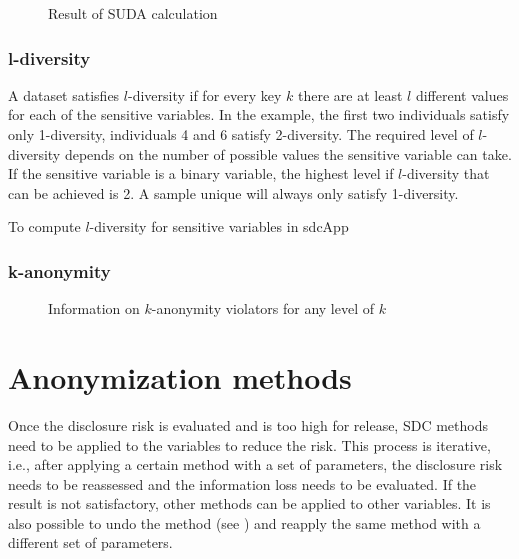 \documentclass[letterpaper,10pt,english]{sphinxmanual}
\begin{document}
\begin{figure}[htbp]
\centering
\capstart

\noindent{}
\caption{Result of SUDA calculation}\label{\detokenize{risk:fig72}}\label{\detokenize{risk:id4}}\end{figure}


\subsection{l-diversity}
\label{\detokenize{risk:l-diversity}}
A dataset
satisfies \(l\)-diversity if for every key \(k\) there are at least
\(l\) different values for each of the sensitive variables. In the
example, the first two individuals satisfy only 1-diversity, individuals
4 and 6 satisfy 2-diversity. The required level of \(l\)-diversity
depends on the number of possible values the sensitive variable can
take. If the sensitive variable is a binary variable, the highest level
if \(l\)-diversity that can be achieved is 2. A sample unique will
always only satisfy 1-diversity.

To compute \(l\)-diversity for sensitive variables in sdcApp


\subsection{k-anonymity}
\label{\detokenize{risk:k-anonymity}}
\begin{figure}[htbp]
\centering
\capstart

\noindent{}
\caption{Information on \(k\)-anonymity violators for any level of \(k\)}\label{\detokenize{risk:fig73}}\label{\detokenize{risk:id5}}\end{figure}


\chapter{Anonymization methods}
\label{\detokenize{anon::doc}}\label{\detokenize{anon:anonymization-methods}}
Once the disclosure risk is evaluated and is too high for release, SDC methods need
to be applied to the variables to reduce the risk. This process is iterative, i.e.,
after applying a certain method with a set of parameters, the disclosure risk
needs to be reassessed and the information loss needs to be evaluated. If the result is not
satisfactory, other methods can be applied to other variables. It is also possible to
undo the method (see ) and reapply the same method with a different set of parameters.
\end{document}
